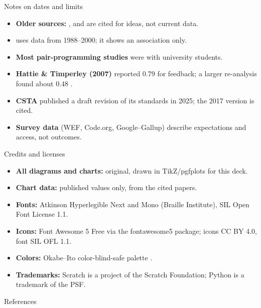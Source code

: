 \documentclass[20pt,t]{beamer}
\begin{document}
\begin{frame}{Notes on dates and limits}
  \small
  \begin{itemize}
    \item \textbf{Older sources:} \textcite{pea1984cognitive}, \textcite{papert1980mindstorms} and
      \textcite{bruner1960process} are cited for ideas, not current data.
    \item \textbf{\textcite{tai2006planning}} uses data from 1988--2000; it shows an association only.
    \item \textbf{Most pair-programming studies} were with university students.
    \item \textbf{Hattie \& Timperley (2007)} reported 0.79 for feedback; a larger re-analysis
      found about 0.48 \parencite{wisniewski2020feedback}.
    \item \textbf{CSTA} published a draft revision of its standards in 2025; the 2017 version is cited.
    \item \textbf{Survey data} (WEF, Code.org, Google--Gallup) describe expectations and access, not outcomes.
  \end{itemize}
\end{frame}

\begin{frame}{Credits and licenses}
  \small
  \begin{itemize}
    \item \textbf{All diagrams and charts:} original, drawn in TikZ/pgfplots for this deck.
    \item \textbf{Chart data:} published values only, from the cited papers.
    \item \textbf{Fonts:} Atkinson Hyperlegible Next and Mono (Braille Institute), SIL Open Font License 1.1.
    \item \textbf{Icons:} Font Awesome 5 Free via the fontawesome5 package; icons CC BY 4.0, font SIL OFL 1.1.
    \item \textbf{Colors:} Okabe--Ito color-blind-safe palette \parencite{okabe2008cud}.
    \item \textbf{Trademarks:} Scratch is a project of the Scratch Foundation; Python is a trademark of the PSF.
  \end{itemize}
\end{frame}

\begin{frame}[allowframebreaks]{References}
  \printbibliography[heading=none]
\end{frame}
\end{document}
